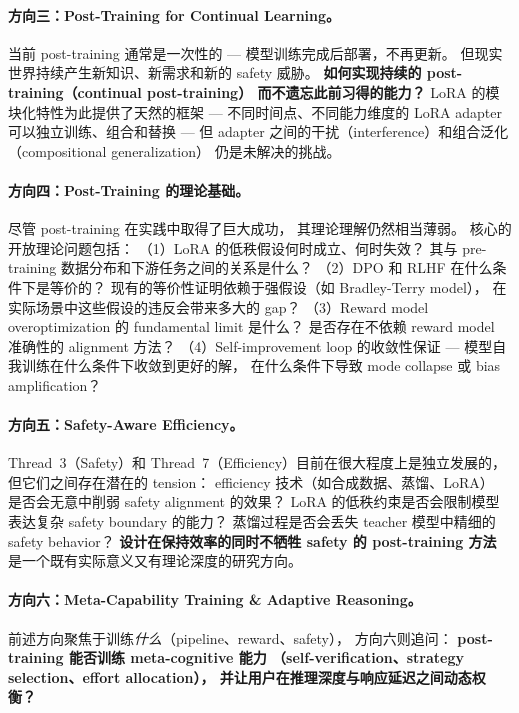 \paragraph{方向三：Post-Training for Continual Learning。}
当前 post-training 通常是一次性的 ---
模型训练完成后部署，不再更新。
但现实世界持续产生新知识、新需求和新的 safety 威胁。
\textbf{如何实现持续的 post-training（continual post-training）
而不遗忘此前习得的能力？}
LoRA 的模块化特性为此提供了天然的框架 ---
不同时间点、不同能力维度的 LoRA adapter 可以独立训练、组合和替换 ---
但 adapter 之间的干扰（interference）和组合泛化（compositional generalization）
仍是未解决的挑战。

\paragraph{方向四：Post-Training 的理论基础。}
尽管 post-training 在实践中取得了巨大成功，
其理论理解仍然相当薄弱。
核心的开放理论问题包括：
（1）LoRA 的低秩假设何时成立、何时失效？
其与 pre-training 数据分布和下游任务之间的关系是什么？
（2）DPO 和 RLHF 在什么条件下是等价的？
现有的等价性证明依赖于强假设（如 Bradley-Terry model），
在实际场景中这些假设的违反会带来多大的 gap？
（3）Reward model overoptimization 的 fundamental limit 是什么？
是否存在不依赖 reward model 准确性的 alignment 方法？
（4）Self-improvement loop 的收敛性保证 ---
模型自我训练在什么条件下收敛到更好的解，
在什么条件下导致 mode collapse 或 bias amplification？

\paragraph{方向五：Safety-Aware Efficiency。}
Thread~3（Safety）和 Thread~7（Efficiency）目前在很大程度上是独立发展的，
但它们之间存在潜在的 tension：
efficiency 技术（如合成数据、蒸馏、LoRA）
是否会无意中削弱 safety alignment 的效果？
LoRA 的低秩约束是否会限制模型表达复杂 safety boundary 的能力？
蒸馏过程是否会丢失 teacher 模型中精细的 safety behavior？
\textbf{设计在保持效率的同时不牺牲 safety 的 post-training 方法}
是一个既有实际意义又有理论深度的研究方向。

\paragraph{方向六：Meta-Capability Training \& Adaptive Reasoning。}
前述方向聚焦于训练\textit{什么}（pipeline、reward、safety），
方向六则追问：
\textbf{post-training 能否训练 meta-cognitive 能力
（self-verification、strategy selection、effort allocation），
并让用户在推理深度与响应延迟之间动态权衡？}

